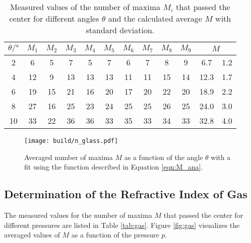 \begin{table}
    \centering
    \begin{tabular}{S S S S S S S S S S S[table-format=2.1] @{${}\pm{}$} S[table-format=1.1]}
        \toprule
        {$\theta/\si{\degree}$} & {$M_1$} & {$M_2$} & {$M_3$} & {$M_4$} & {$M_5$} & {$M_6$} & {$M_7$} & {$M_8$} & {$M_9$} &  \\
         & 6  & 5  & 7  & 5  & 7  & 6  & 7  & 8  & 9   & 6.7 & 1.2  \\
        4 & 12 & 9  & 13 & 13 & 13 & 11 & 11 & 15 & 14  & 12.3 & 1.7 \\
        6 & 19 & 15 & 21 & 16 & 20 & 17 & 20 & 22 & 20  & 18.9 & 2.2 \\
        8 & 27 & 16 & 25 & 23 & 24 & 25 & 25 & 26 & 25  & 24.0 & 3.0 \\
        10 & 33 & 22 & 36 & 36 & 33 & 35 & 33 & 34 & 33 & 32.8 & 4.0 \\
        \bottomrule
    \end{tabular}
    \caption{Measured values of the number of maxima $M_i$ that passed the center for different angles $\theta$ and the calculated average $M$ with standard deviation.}
    \label{tab:glass}
\end{table}

\begin{figure}
    \centering 
    \texttt{[image: build/n\_glass.pdf]}
    \caption{Averaged number of maxima $M$ as a function of the angle $\theta$ with a fit using the function described in Equation \eqref{eqn:M_ana}.}
    \label{fig:glass}
\end{figure}

\subsection{Determination of the Refractive Index of Gas}
The measured values for the number of maxima $M$ that passed 
the center for different pressures are listed in Table \ref{tab:gas}. 
Figure \ref{fig:gas} visualizes the averaged values of $M$ as a 
function of the pressure $p$.

